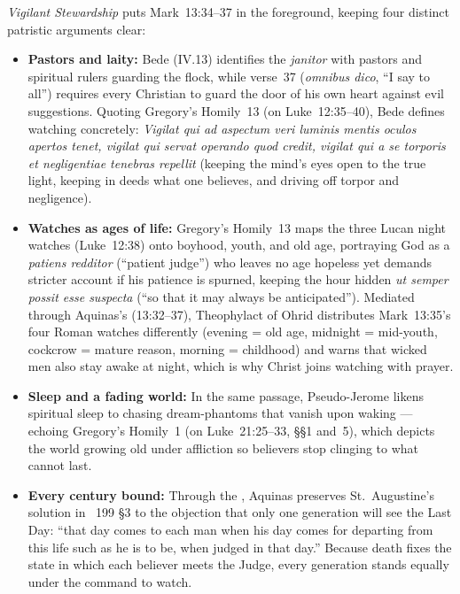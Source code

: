 \emph{Vigilant Stewardship} puts Mark~13:34--37 in the foreground, keeping four distinct patristic arguments clear:
\begin{itemize}[leftmargin=1.5em,itemsep=0.2em]
\item \textbf{Pastors and laity:} Bede (IV.13) identifies the \emph{janitor} with pastors and spiritual rulers guarding the flock, while verse~37 (\emph{omnibus dico}, ``I say to all'') requires every Christian to guard the door of his own heart against evil suggestions. Quoting Gregory's Homily~13 (on Luke~12:35--40), Bede defines watching concretely: \emph{Vigilat qui ad aspectum veri luminis mentis oculos apertos tenet, vigilat qui servat operando quod credit, vigilat qui a se torporis et negligentiae tenebras repellit} (keeping the mind's eyes open to the true light, keeping in deeds what one believes, and driving off torpor and negligence).
\item \textbf{Watches as ages of life:} Gregory's Homily~13 maps the three Lucan night watches (Luke~12:38) onto boyhood, youth, and old age, portraying God as a \emph{patiens redditor} (``patient judge'') who leaves no age hopeless yet demands stricter account if his patience is spurned, keeping the hour hidden \emph{ut semper possit esse suspecta} (``so that it may always be anticipated''). Mediated through Aquinas's  (13:32--37), Theophylact of Ohrid distributes Mark~13:35's four Roman watches differently (evening = old age, midnight = mid-youth, cockcrow = mature reason, morning = childhood) and warns that wicked men also stay awake at night, which is why Christ joins watching with prayer.
\item \textbf{Sleep and a fading world:} In the same  passage, Pseudo-Jerome likens spiritual sleep to chasing dream-phantoms that vanish upon waking --- echoing Gregory's Homily~1 (on Luke~21:25--33, §§1 and~5), which depicts the world growing old under affliction so believers stop clinging to what cannot last.
\item \textbf{Every century bound:} Through the , Aquinas preserves St.~Augustine's solution in ~199 §3 to the objection that only one generation will see the Last Day: ``that day comes to each man when his day comes for departing from this life such as he is to be, when judged in that day.'' Because death fixes the state in which each believer meets the Judge, every generation stands equally under the command to watch.
\end{itemize}

